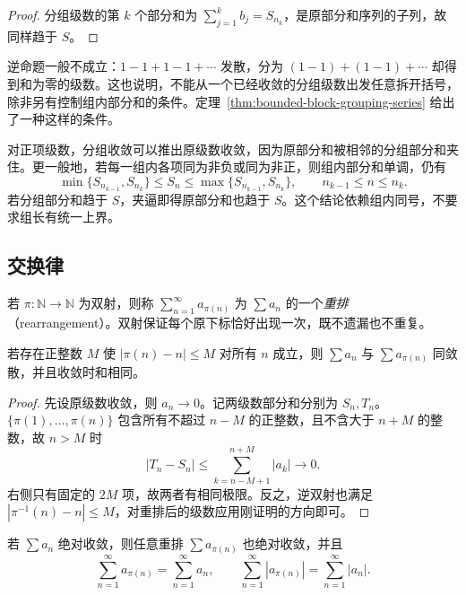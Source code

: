 \begin{proof}
分组级数的第 $k$ 个部分和为 $\sum_{j=1}^k b_j=S_{n_k}$，是原部分和序列的子列，故同样趋于 $S$。
\end{proof}

逆命题一般不成立：$1-1+1-1+\cdots$ 发散，分为 $(1-1)+(1-1)+\cdots$ 却得到和为零的级数。这也说明，不能从一个已经收敛的分组级数出发任意拆开括号，除非另有控制组内部分和的条件。定理~\ref{thm:bounded-block-grouping-series} 给出了一种这样的条件。

对正项级数，分组收敛可以推出原级数收敛，因为原部分和被相邻的分组部分和夹住。更一般地，若每一组内各项同为非负或同为非正，则组内部分和单调，仍有
\[
    \min\{S_{n_{k-1}},S_{n_k}\}\leq S_n
       \leq\max\{S_{n_{k-1}},S_{n_k}\},
    \qquad n_{k-1}\leq n\leq n_k.
\]
若分组部分和趋于 $S$，夹逼即得原部分和也趋于 $S$。这个结论依赖组内同号，不要求组长有统一上界。

\subsection{交换律}
\label{subsec:commutativity-of-series}

\begin{definition}
若 $\pi:\mathbb N\to\mathbb N$ 为双射，则称 $\sum_{n=1}^{\infty}a_{\pi(n)}$ 为 $\sum a_n$ 的一个\emph{重排}（rearrangement）。双射保证每个原下标恰好出现一次，既不遗漏也不重复。
\end{definition}

\begin{theorem}[有界位移重排]
\label{thm:bounded-displacement-rearrangement}
若存在正整数 $M$ 使 $|\pi(n)-n|\leq M$ 对所有 $n$ 成立，则 $\sum a_n$ 与 $\sum a_{\pi(n)}$ 同敛散，并且收敛时和相同。
\end{theorem}

\begin{proof}
先设原级数收敛，则 $a_n\to0$。记两级数部分和分别为 $S_n,T_n$。$\{\pi(1),\ldots,\pi(n)\}$ 包含所有不超过 $n-M$ 的正整数，且不含大于 $n+M$ 的整数，故 $n>M$ 时
\[
    |T_n-S_n|\leq\sum_{k=n-M+1}^{n+M}|a_k|\longrightarrow0.
\]
右侧只有固定的 $2M$ 项，故两者有相同极限。反之，逆双射也满足 $|\pi^{-1}(n)-n|\leq M$，对重排后的级数应用刚证明的方向即可。
\end{proof}

\begin{theorem}[绝对收敛级数的重排]
\label{thm:absolutely-convergent-series-rearrangement}
若 $\sum a_n$ 绝对收敛，则任意重排 $\sum a_{\pi(n)}$ 也绝对收敛，并且
\[
    \sum_{n=1}^{\infty}a_{\pi(n)}=\sum_{n=1}^{\infty}a_n,
    \qquad
    \sum_{n=1}^{\infty}|a_{\pi(n)}|=\sum_{n=1}^{\infty}|a_n|.
\]
\end{theorem}

